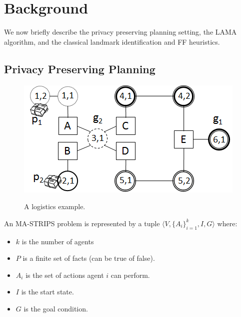 \documentclass[letterpaper]{article}
\theoremstyle{definition}
\begin{document}

\section{Background}

We now briefly describe the privacy preserving planning setting, the LAMA algorithm, and the classical landmark identification and FF heuristics.

\subsection{Privacy Preserving Planning}

\begin{figure}
\centering
\includegraphics[scale=0.7]{Logistics}
\label{fig:logistics}
\caption{A logistics example.}
\end{figure}

An MA-STRIPS problem\citep{brafman2013complexity} is represented by a tuple $\langle V, \{A_i\}_{i=1}^k, I ,G \rangle$ where:
\begin{itemize}
	\item $k$ is the number of agents
	\item $P$ is a finite set of facts (can be true of false). 
    \item $A_i$ is the set of actions agent $i$ can perform. 
	\item $I$ is the start state.
	\item $G$ is the goal condition.	
\end{itemize} 
\end{document}
